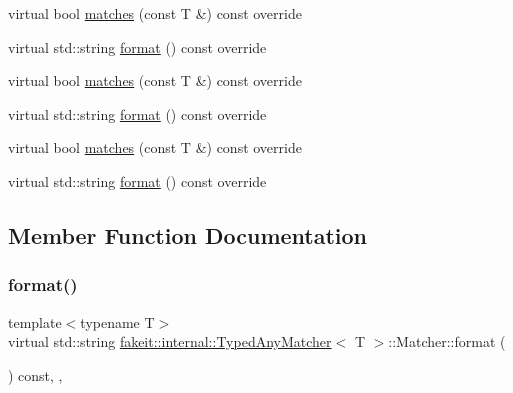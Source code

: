 \begin{DoxyCompactItemize}
\item 
virtual bool \mbox{\hyperlink{structfakeit_1_1internal_1_1TypedAnyMatcher_1_1Matcher_a7a4fb0a098671bd53dd9403169734649}{matches}} (const T \&) const override
\item 
virtual std\+::string \mbox{\hyperlink{structfakeit_1_1internal_1_1TypedAnyMatcher_1_1Matcher_ab992800fe5c4013e40afe8761e24e715}{format}} () const override
\item 
virtual bool \mbox{\hyperlink{structfakeit_1_1internal_1_1TypedAnyMatcher_1_1Matcher_a7a4fb0a098671bd53dd9403169734649}{matches}} (const T \&) const override
\item 
virtual std\+::string \mbox{\hyperlink{structfakeit_1_1internal_1_1TypedAnyMatcher_1_1Matcher_ab992800fe5c4013e40afe8761e24e715}{format}} () const override
\item 
virtual bool \mbox{\hyperlink{structfakeit_1_1internal_1_1TypedAnyMatcher_1_1Matcher_a7a4fb0a098671bd53dd9403169734649}{matches}} (const T \&) const override
\item 
virtual std\+::string \mbox{\hyperlink{structfakeit_1_1internal_1_1TypedAnyMatcher_1_1Matcher_ab992800fe5c4013e40afe8761e24e715}{format}} () const override
\end{DoxyCompactItemize}


\subsection{Member Function Documentation}
\mbox{\label{structfakeit_1_1internal_1_1TypedAnyMatcher_1_1Matcher_ab992800fe5c4013e40afe8761e24e715}} 
\subsubsection{\texorpdfstring{format()}{format()}\hspace{0.1cm}{\footnotesize\ttfamily [1/9]}}
{\footnotesize\ttfamily template$<$typename T$>$ \\
virtual std\+::string \mbox{\hyperlink{structfakeit_1_1internal_1_1TypedAnyMatcher}{fakeit\+::internal\+::\+Typed\+Any\+Matcher}}$<$ T $>$\+::Matcher\+::format (\begin{DoxyParamCaption}{ }\end{DoxyParamCaption}) const\hspace{0.3cm}{\ttfamily [inline]}, {\ttfamily [override]}, {\ttfamily [virtual]}}



